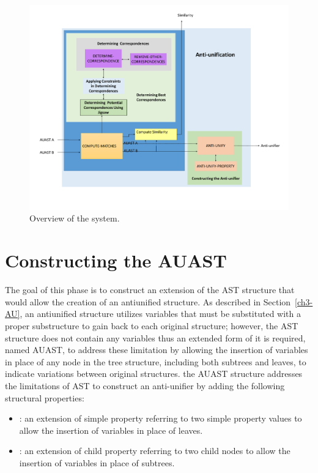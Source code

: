 \begin{figure} [H]
  \centering\includegraphics [width = \textwidth]{Drawing4/overview1.pdf}
  \caption{Overview of the system.}
  \label{fig:meth_overview}
\end{figure}


\section{Constructing the AUAST} \label{meth-constructAUAST}
The goal of this phase is to construct an extension of the AST structure that would allow the creation of an antiunified structure.
As described in Section~\ref{ch3-AU}, an antiunified structure utilizes variables that must be substituted with a proper substructure to gain back to each original structure; however, the AST structure does not contain any variables thus an extended form of it is required, named AUAST, to address these limitation by allowing the insertion of variables in place of any node in the tree structure, including both subtrees and leaves, to indicate variations between original structures. the AUAST structure addresses the limitations of AST to construct an anti-unifier by adding the following structural properties:

\begin{itemize} [leftmargin=.4in]
\item {}: an extension of simple property referring to two simple property values to allow the insertion of variables in place of leaves.
\end{itemize}
\begin{itemize} [leftmargin=.4in]
\item {}: an extension of child property referring to two child nodes to allow the insertion of variables in place of subtrees.

\end{itemize}


